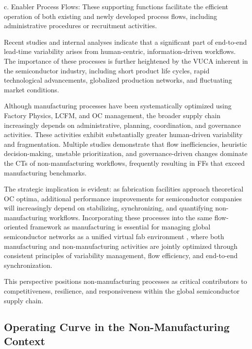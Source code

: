 \documentclass[preprint,12pt,authoryear]{elsarticle}
\begin{document}
c. Enabler Process Flows: These supporting functions facilitate the efficient operation of both existing and newly developed process flows, including administrative procedures or recruitment activities.

Recent studies and internal analyses indicate that a significant part of end-to-end lead-time variability arises from human-centric, information-driven workflows. The importance of these processes is further heightened by the VUCA inherent in the semiconductor industry, including short product life cycles, rapid technological advancements, globalized production networks, and fluctuating market conditions.

Although manufacturing processes have been systematically optimized using Factory Physics, LCFM, and OC management, the broader supply chain increasingly depends on administrative, planning, coordination, and governance activities. These activities exhibit substantially greater human-driven variability and fragmentation. Multiple studies demonstrate that flow inefficiencies, heuristic decision-making, unstable prioritization, and governance-driven changes \citep{Loesch2019,Kleinmuntz1987,Seddon2011} dominate the CTs of non-manufacturing workflows, frequently resulting in FFs that exceed manufacturing benchmarks.

The strategic implication is evident: as fabrication facilities approach theoretical OC optima, additional performance improvements for semiconductor companies will increasingly depend on stabilizing, synchronizing, and quantifying non-manufacturing workflows. Incorporating these processes into the same flow-oriented framework as manufacturing is essential for managing global semiconductor networks as a unified virtual fab environment \citep{ehm2011}, where both manufacturing and non-manufacturing activities are jointly optimized through consistent principles of variability management, flow efficiency, and end-to-end synchronization.

This perspective positions non-manufacturing processes as critical contributors to competitiveness, resilience, and responsiveness within the global semiconductor supply chain.



\subsection{Operating Curve in the Non-Manufacturing Context}\label{subsec:Operating Curve in the Non-Manufacturing Context}
\end{document}
